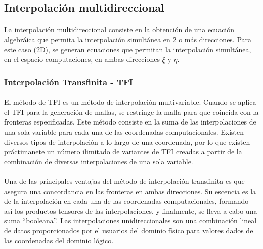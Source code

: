 \documentclass[letterpaper, openright, 12pt]{book}
\begin{document}
    \subsection{Interpolación multidireccional}
    \paragraph*{}
    La interpolación multidireccional consiste en la obtención de una
    ecuación algebráica que permita la interpolación simultánea en 2 o más
    direcciones. Para este caso (2D), se generan ecuaciones que permitan la
    interpolación simultánea, en el espacio computaciones, en ambas
    direcciones $\xi$ y $\eta$.

    \subsubsection{Interpolación Transfinita - TFI}
    \paragraph*{}
    El método de TFI es un método de interpolación multivariable. Cuando se
    aplica el TFI para la generación de mallas, se restringe la malla para
    que coincida con la fronteras especificadas. Este método consiste en la
    suma de las interpolaciones de una sola variable para cada una de las
    coordenadas computacionales. Existen diversos tipos de interpolación a
    lo largo de una coordenada, por lo que existen práctimanete un número
    ilimitado de variantes de TFI creadas a partir de la combinación de
    diversas interpolaciones de una sola variable.\cite{thompsonhandbook}

    \paragraph*{}
    Una de las principales ventajas del método de interpolación transfinita
    es que asegura una concordancia en las fronteras en ambas direcciones.
    Su escencia es la de la interpolación en cada una de las coordenadas
    computacionales, formando así los productos tensores de las
    interpolaciones, y finalmente, se lleva a cabo una suma ``booleana''.
    Las interpolaciones unidireccionales son una combinación lineal de datos
    proporcionados por el usuarios del dominio físico para valores dados de
    las coordenadas del dominio lógico.
\end{document}
